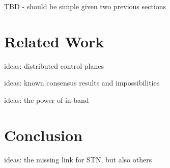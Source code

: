 \documentclass[conference]{sigcomm-alternate}
\begin{document}
TBD - should be simple given two previous sections


\section{Related Work}\label{sec:relwork}

ideas: distributed control planes

ideas: known consensus results and impossibilities

ideas: the power of in-band

\section{Conclusion}\label{sec:conclusion}

ideas: the missing link for STN, but also others

{

}
\end{document}
